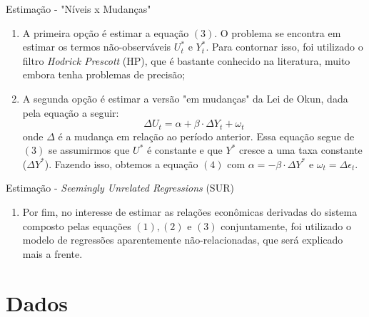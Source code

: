 \documentclass[11pt]{beamer}
\newcommand\setItemnumber[1]{\setcounter{enumi}{\numexpr#1-1\relax}}
\begin{document}
\begin{frame}{Estimação - "Níveis x Mudanças"}

\begin{enumerate}
    \item A primeira opção é estimar a equação $(3)$. O problema se encontra em estimar os termos não-observáveis $U_t^*$ e $Y_t^*$. Para contornar isso, foi utilizado o filtro \textit{Hodrick Prescott} (HP), que é bastante conhecido na literatura, muito embora tenha problemas de precisão;
    
    \item A segunda opção é estimar a versão "em mudanças" da Lei de Okun, dada pela equação a seguir:
    \begin{equation}
    \Delta U_t = \alpha + \beta \cdot \Delta Y_t + \omega_t
    \end{equation}
    onde $\Delta$ é a mudança em relação ao período anterior. Essa equação segue de $(3)$ se assumirmos que $U^*$ é constante e que $Y^*$ cresce a uma taxa constante ($\Delta Y^*$). Fazendo isso, obtemos a equação $(4)$ com $\alpha = -\beta \cdot \Delta Y^*$ e $\omega_t = \Delta \epsilon_t$.
\end{enumerate}

\end{frame}

\begin{frame}{Estimação - \textit{Seemingly Unrelated Regressions} (SUR)}

\begin{enumerate}
  \setItemnumber{3}
    \item Por fim, no interesse de estimar as relações econômicas derivadas do sistema composto pelas equações $(1), (2)$ e $(3)$ conjuntamente, foi utilizado o modelo de regressões aparentemente não-relacionadas, que será explicado mais a frente.
\end{enumerate}

\end{frame}

\section{Dados}
\end{document}
